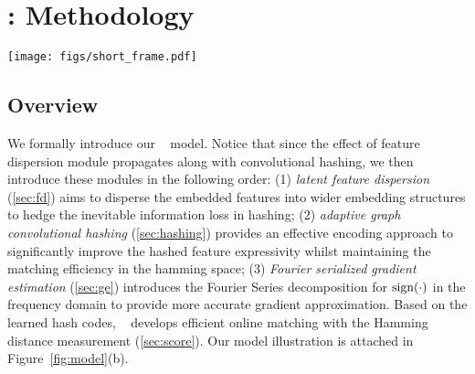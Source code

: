 \section{\model: Methodology}
\label{sec:method}
\begin{figure*}[tp]
\hspace{-0.1in}
\begin{minipage}{1\textwidth}
\texttt{[image: figs/short\_frame.pdf]}
\end{minipage} 
\vspace{-0.1in}
\caption{(a) Visualized loss landscape comparison; (b) \model~model framework (best view in color); (c) Fourier Serialized gradient estimation in forward and bachward propagation. }
\label{fig:model}
\end{figure*}


\subsection{Overview}
We formally introduce our \model~ model.
Notice that since the effect of feature dispersion module propagates along with convolutional hashing, we then introduce these modules in the following order:
(1) \textit{latent feature dispersion} (\cref{sec:fd}) aims to disperse the embedded features into wider embedding structures to hedge the inevitable information loss in hashing;
(2) \textit{adaptive graph convolutional hashing} (\cref{sec:hashing}) provides an effective encoding approach to significantly improve the hashed feature expressivity whilst maintaining the matching efficiency in the hamming space;
(3) \textit{Fourier serialized gradient estimation} (\cref{sec:ge}) introduces the Fourier Series decomposition for $\operatorname{sign}(\cdot)$ in the frequency domain to provide more accurate gradient approximation.
Based on the learned hash codes, \model~ develops efficient online matching with the Hamming distance measurement (\cref{sec:score}).
Our model illustration is attached in Figure~\ref{fig:model}(b).
















